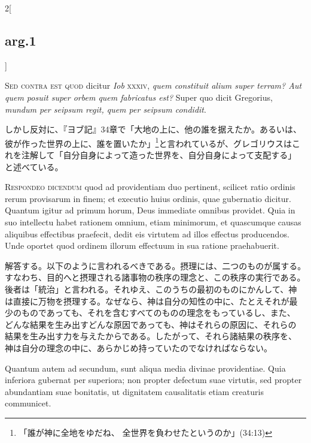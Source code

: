 \documentclass[paper=a4paper,fontsize=10pt,jafontsize=9pt,titlepage]{jlreq}
\begin{document}
\begin{paracol}{2}[\subsection{arg.1}]
\switchcolumn*[\subsection{s.c.}]

{\scshape Sed contra est quod} dicitur {\itshape Iob} {\scshape xxxiv}, {\itshape quem
constituit alium super terram? Aut quem posuit super orbem quem
fabricatus est?} Super quo dicit Gregorius, {\itshape mundum per seipsum regit,
quem per seipsum condidit}.

\switchcolumn

しかし反対に、『ヨブ記』34章で「大地の上に、他の誰を据えたか。あるいは、
彼が作った世界の上に、誰を置いたか」\footnote{「誰が神に全地をゆだね、
全世界を負わせたというのか」(34:13)}と言われているが、グレゴリウスはこ
れを注解して「自分自身によって造った世界を、自分自身によって支配する」
と述べている。


{\scshape Respondeo dicendum} quod ad providentiam duo
pertinent, scilicet ratio ordinis rerum provisarum in finem; et executio
huius ordinis, quae gubernatio dicitur. Quantum igitur ad primum horum,
Deus immediate omnibus providet. Quia in suo intellectu habet rationem
omnium, etiam minimorum, et quascumque causas aliquibus effectibus
praefecit, dedit eis virtutem ad illos effectus producendos. Unde
oportet quod ordinem illorum effectuum in sua ratione
praehabuerit.

\switchcolumn

解答する。以下のように言われるべきである。摂理には、二つのものが属する。
すなわち、目的へと摂理される諸事物の秩序の理念と、この秩序の実行である。
後者は「統治」と言われる。それゆえ、このうちの最初のものにかんして、神
は直接に万物を摂理する。なぜなら、神は自分の知性の中に、たとえそれが最
少のものであっても、それを含むすべてのものの理念をもっているし、また、
どんな結果を生み出すどんな原因であっても、神はそれらの原因に、それらの
結果を生み出す力を与えたからである。したがって、それら諸結果の秩序を、
神は自分の理念の中に、あらかじめ持っていたのでなければならない。

\switchcolumn*

Quantum autem ad secundum, sunt aliqua media divinae
providentiae. Quia inferiora gubernat per superiora; non propter
defectum suae virtutis, sed propter abundantiam suae bonitatis, ut
dignitatem causalitatis etiam creaturis communicet.


\end{paracol}
\end{document}
